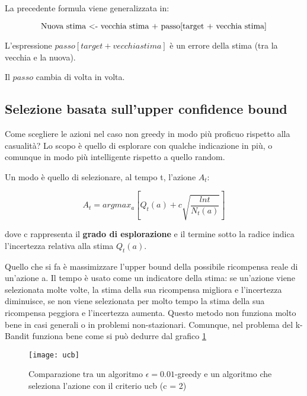 La precedente formula viene generalizzata in:

\begin{equation}
 $Nuova stima <- vecchia stima + passo[target + vecchia stima]$
\end{equation}

L'espressione $passo[target + vecchia stima]$ è un errore della stima (tra la vecchia
e la nuova).

Il $passo$ cambia di volta in volta.


\subsection{Selezione basata sull'upper confidence bound}

Come scegliere le azioni nel caso non greedy in modo più proficuo
rispetto alla casualità? Lo scopo è quello di esplorare con qualche indicazione
in più, o comunque in modo più intelligente rispetto a quello random.

Un modo è quello di selezionare, al tempo t, l'azione $A_t$:

\begin{equation}
A_t = argmax_a [Q_t(a) + c \sqrt{\frac{ln t}{N_t(a)}}]
\end{equation}

dove c rappresenta il \textbf{grado di esplorazione} e il termine
sotto la radice indica l'incertezza relativa alla stima $Q_t(a)$.

Quello che si fa è massimizzare l'upper bound della possibile
ricompensa reale di un'azione a. Il tempo è usato come un
indicatore della stima: se un'azione viene selezionata molte volte,
la stima della sua ricompensa migliora e l'incertezza diminuisce,
se non viene selezionata per molto tempo la stima della sua
ricompensa peggiora e l'incertezza aumenta.
Questo metodo non funziona molto bene in casi generali o in problemi
non-stazionari. Comunque, nel problema del k-Bandit funziona bene
come si può dedurre dal grafico \ref{fig:ucb}

\begin{figure}[H]
\centering
\texttt{[image: ucb]}
\caption{Comparazione tra un algoritmo $\epsilon = 0.01$-greedy e un algoritmo
che seleziona l'azione con il criterio ucb (c = 2)}
\label{fig:ucb}
\end{figure}



